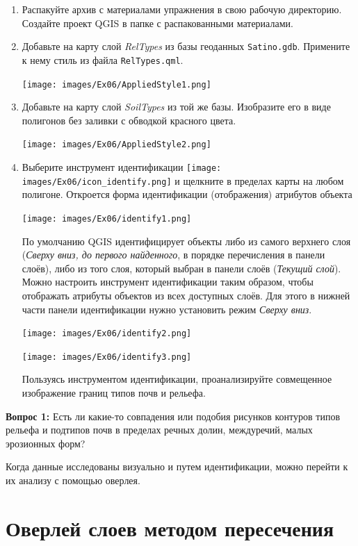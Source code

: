 \documentclass[
  12pt,
]{book}
\begin{document}
\begin{enumerate}
\def\labelenumi{\arabic{enumi}.}
\item
  Распакуйте архив с материалами упражнения в свою рабочую директорию. Создайте проект QGIS в папке с распакованными материалами.
\item
  Добавьте на карту слой \emph{RelTypes} из базы геоданных \texttt{Satino.gdb}. Примените к нему стиль из файла \texttt{RelTypes.qml}.

  \texttt{[image: images/Ex06/AppliedStyle1.png]}
\item
  Добавьте на карту слой \emph{SoilTypes} из той же базы. Изобразите его в виде полигонов без заливки с обводкой красного цвета.

  \texttt{[image: images/Ex06/AppliedStyle2.png]}
\item
  Выберите инструмент идентификации \texttt{[image: images/Ex06/icon\_identify.png]} и щелкните в пределах карты на любом полигоне. Откроется форма идентификации (отображения) атрибутов объекта

  \texttt{[image: images/Ex06/identify1.png]}

  По умолчанию QGIS идентифицирует объекты либо из самого верхнего слоя (\emph{Сверху вниз, до первого найденного}, в порядке перечисления в панели слоёв), либо из того слоя, который выбран в панели слоёв (\emph{Текущий слой}). Можно настроить инструмент идентификации таким образом, чтобы отображать атрибуты объектов из всех доступных слоёв. Для этого в нижней части панели идентификации нужно установить режим \emph{Сверху вниз}.

  \texttt{[image: images/Ex06/identify2.png]}

  \texttt{[image: images/Ex06/identify3.png]}

  Пользуясь инструментом идентификации, проанализируйте совмещенное изображение границ типов почв и рельефа.
\end{enumerate}

\textbf{Вопрос 1:} Есть ли какие-то совпадения или подобия рисунков контуров типов рельефа и подтипов почв в пределах речных долин, междуречий, малых эрозионных форм?

Когда данные исследованы визуально и путем идентификации, можно перейти к их анализу с помощью оверлея.

\hypertarget{overlay-intersect}{%
\section{Оверлей слоев методом пересечения}\label{overlay-intersect}}
\end{document}

